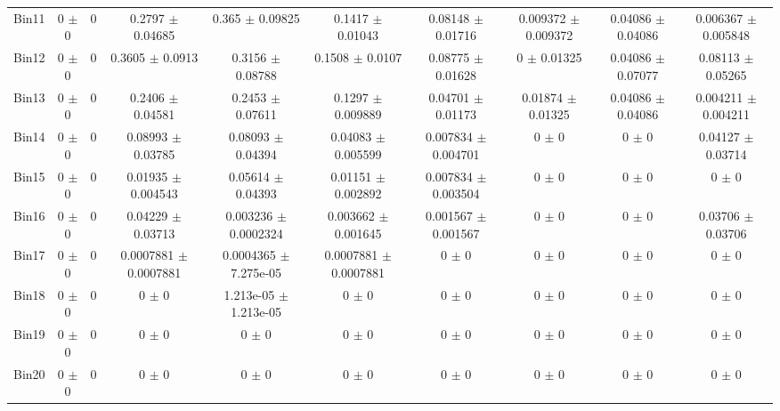 \begin{tabular}{@{\extracolsep{4pt}}lccccccccc@{}}
     Bin11 & 0 $\pm$ 0 & 0 & 0.2797 $\pm$ 0.04685 & 0.365 $\pm$ 0.09825 & 0.1417 $\pm$ 0.01043 & 0.08148 $\pm$ 0.01716 & 0.009372 $\pm$ 0.009372 & 0.04086 $\pm$ 0.04086 & 0.006367 $\pm$ 0.005848 \\ 
     Bin12 & 0 $\pm$ 0 & 0 & 0.3605 $\pm$ 0.0913 & 0.3156 $\pm$ 0.08788 & 0.1508 $\pm$ 0.0107 & 0.08775 $\pm$ 0.01628 & 0 $\pm$ 0.01325 & 0.04086 $\pm$ 0.07077 & 0.08113 $\pm$ 0.05265 \\ 
     Bin13 & 0 $\pm$ 0 & 0 & 0.2406 $\pm$ 0.04581 & 0.2453 $\pm$ 0.07611 & 0.1297 $\pm$ 0.009889 & 0.04701 $\pm$ 0.01173 & 0.01874 $\pm$ 0.01325 & 0.04086 $\pm$ 0.04086 & 0.004211 $\pm$ 0.004211 \\ 
     Bin14 & 0 $\pm$ 0 & 0 & 0.08993 $\pm$ 0.03785 & 0.08093 $\pm$ 0.04394 & 0.04083 $\pm$ 0.005599 & 0.007834 $\pm$ 0.004701 & 0 $\pm$ 0 & 0 $\pm$ 0 & 0.04127 $\pm$ 0.03714 \\ 
     Bin15 & 0 $\pm$ 0 & 0 & 0.01935 $\pm$ 0.004543 & 0.05614 $\pm$ 0.04393 & 0.01151 $\pm$ 0.002892 & 0.007834 $\pm$ 0.003504 & 0 $\pm$ 0 & 0 $\pm$ 0 & 0 $\pm$ 0 \\ 
     Bin16 & 0 $\pm$ 0 & 0 & 0.04229 $\pm$ 0.03713 & 0.003236 $\pm$ 0.0002324 & 0.003662 $\pm$ 0.001645 & 0.001567 $\pm$ 0.001567 & 0 $\pm$ 0 & 0 $\pm$ 0 & 0.03706 $\pm$ 0.03706 \\ 
     Bin17 & 0 $\pm$ 0 & 0 & 0.0007881 $\pm$ 0.0007881 & 0.0004365 $\pm$ 7.275e-05 & 0.0007881 $\pm$ 0.0007881 & 0 $\pm$ 0 & 0 $\pm$ 0 & 0 $\pm$ 0 & 0 $\pm$ 0 \\ 
     Bin18 & 0 $\pm$ 0 & 0 & 0 $\pm$ 0 & 1.213e-05 $\pm$ 1.213e-05 & 0 $\pm$ 0 & 0 $\pm$ 0 & 0 $\pm$ 0 & 0 $\pm$ 0 & 0 $\pm$ 0 \\ 
     Bin19 & 0 $\pm$ 0 & 0 & 0 $\pm$ 0 & 0 $\pm$ 0 & 0 $\pm$ 0 & 0 $\pm$ 0 & 0 $\pm$ 0 & 0 $\pm$ 0 & 0 $\pm$ 0 \\ 
     Bin20 & 0 $\pm$ 0 & 0 & 0 $\pm$ 0 & 0 $\pm$ 0 & 0 $\pm$ 0 & 0 $\pm$ 0 & 0 $\pm$ 0 & 0 $\pm$ 0 & 0 $\pm$ 0 \\ 
\hline\hline
  \end{tabular}
